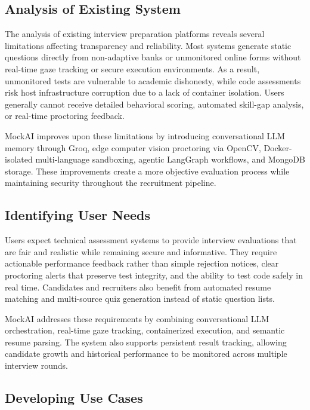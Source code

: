 \documentclass[12pt,a4paper]{report}
\begin{document}
\subsection{Analysis of Existing System}

The analysis of existing interview preparation platforms reveals several limitations
affecting transparency and reliability. Most systems generate static questions directly from
non-adaptive banks or unmonitored online forms without real-time gaze tracking or secure
execution environments. As a result, unmonitored tests are vulnerable to academic
dishonesty, while code assessments risk host infrastructure corruption due to a lack of
container isolation. Users generally cannot receive detailed behavioral scoring, automated
skill-gap analysis, or real-time proctoring feedback.

MockAI improves upon these limitations by introducing conversational LLM memory
through Groq, edge computer vision proctoring via OpenCV, Docker-isolated multi-language
sandboxing, agentic LangGraph workflows, and MongoDB storage. These improvements
create a more objective evaluation process while maintaining security throughout the
recruitment pipeline.

\subsection{Identifying User Needs}

Users expect technical assessment systems to provide interview evaluations that are fair
and realistic while remaining secure and informative. They require actionable performance
feedback rather than simple rejection notices, clear proctoring alerts that preserve test
integrity, and the ability to test code safely in real time. Candidates and recruiters also
benefit from automated resume matching and multi-source quiz generation instead of
static question lists.

MockAI addresses these requirements by combining conversational LLM orchestration,
real-time gaze tracking, containerized execution, and semantic resume parsing. The system
also supports persistent result tracking, allowing candidate growth and historical
performance to be monitored across multiple interview rounds.

\subsection{Developing Use Cases}
\end{document}
